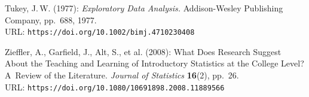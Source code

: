 \begin{thebibliography}{10}
    Tukey, J.\,W. (1977):
 {\it  Exploratory Data Analysis.} Addison-Wesley Publishing Company,  pp.~688, 1977. 
 \\
 URL: {\tt https://doi.org/10.1002/bimj.4710230408}

    Zieffler, A., Garfield, J., Alt, S., et al. (2008):
    What Does Research Suggest About the Teaching and Learning of Introductory 
    Statistics at the College Level? A~Review of the Literature. 
    {\it Journal of Statistics} {\bf 16}(2), pp.~26.
		\\
    URL: {\tt https://doi.org/10.1080/10691898.2008.11889566}

\end{thebibliography}


